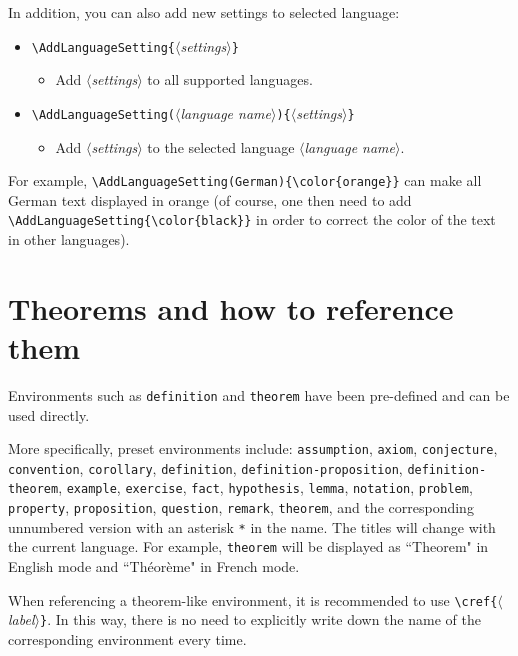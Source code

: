 \documentclass[puretext]{simplivre}
\providecommand{\meta}[1]{$\langle${\normalfont\itshape#1}$\rangle$}
\begin{document}
\medskip
In addition, you can also add new settings to selected language:
\begin{itemize}
    \item \lstinline|\AddLanguageSetting{|\meta{settings}\lstinline|}|
    \begin{itemize}
        \item Add \meta{settings} to all supported languages.
    \end{itemize}
    \item \lstinline|\AddLanguageSetting(|\meta{language name}\lstinline|){|\meta{settings}\lstinline|}|
    \begin{itemize}
        \item Add \meta{settings} to the selected language \meta{language name}.
    \end{itemize}
\end{itemize}
For example, \lstinline|\AddLanguageSetting(German){\color{orange}}| can make all German text displayed in orange (of course, one then need to add \lstinline|\AddLanguageSetting{\color{black}}| in order to correct the color of the text in other languages).


\section{Theorems and how to reference them}

Environments such as \texttt{definition} and \texttt{theorem} have been pre-defined and can be used directly.  

More specifically, preset environments include: 
\texttt{assumption}, \texttt{axiom}, \texttt{conjecture}, \texttt{convention}, \texttt{corollary}, \texttt{definition}, \texttt{definition-proposition}, \texttt{definition-theorem}, \texttt{example}, \texttt{exercise}, \texttt{fact}, \texttt{hypothesis}, \texttt{lemma}, \texttt{notation}, \texttt{problem}, \texttt{property}, \texttt{proposition}, \texttt{question}, \texttt{remark}, \texttt{theorem}, and the corresponding unnumbered version with an asterisk \lstinline|*| in the name. The titles will change with the current language. For example, \texttt{theorem} will be displayed as ``Theorem" in English mode and ``Théorème" in French mode.

When referencing a theorem-like environment, it is recommended to use \lstinline|\cref{|\meta{label}\texttt{\}}. In this way, there is no need to explicitly write down the name of the corresponding environment every time.
\end{document}
